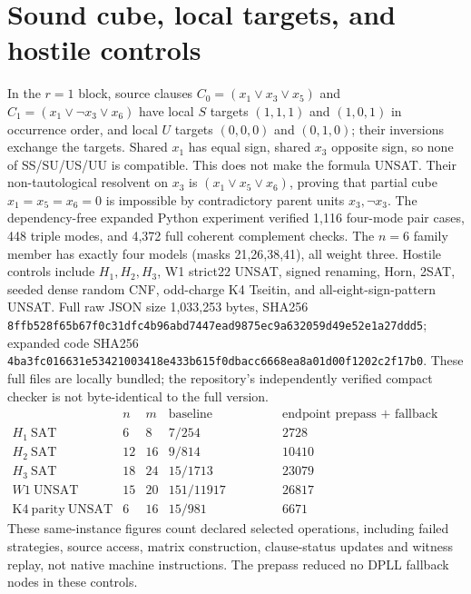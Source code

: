 \documentclass[11pt]{article}
\begin{document}
\section{Sound cube, local targets, and hostile controls}
In the $r=1$ block, source clauses $C_0=(x_1\vee x_3\vee x_5)$ and $C_1=(x_1\vee\neg x_3\vee x_6)$ have local $S$ targets $(1,1,1)$ and $(1,0,1)$ in occurrence order, and local $U$ targets $(0,0,0)$ and $(0,1,0)$; their inversions exchange the targets. Shared $x_1$ has equal sign, shared $x_3$ opposite sign, so none of SS/SU/US/UU is compatible. This does not make the formula UNSAT. Their non-tautological resolvent on $x_3$ is $(x_1\vee x_5\vee x_6)$, proving that partial cube $x_1=x_5=x_6=0$ is impossible by contradictory parent units $x_3,\neg x_3$.
The dependency-free expanded Python experiment verified 1,116 four-mode pair cases, 448 triple modes, and 4,372 full coherent complement checks. The $n=6$ family member has exactly four models (masks 21,26,38,41), all weight three. Hostile controls include $H_1,H_2,H_3$, W1 strict22 UNSAT, signed renaming, Horn, 2SAT, seeded dense random CNF, odd-charge K4 Tseitin, and all-eight-sign-pattern UNSAT. Full raw JSON size 1,033,253 bytes, SHA256 \texttt{8ffb528f65b67f0c31dfc4b96abd7447ead9875ec9a632059d49e52e1a27ddd5}; expanded code SHA256 \texttt{4ba3fc016631e53421003418e433b615f0dbacc6668ea8a01d00f1202c2f17b0}. These full files are locally bundled; the repository's independently verified compact checker is not byte-identical to the full version.
\[
\begin{array}{lrrrr}
 &n&m&\text{baseline nodes/ops}&\text{endpoint prepass + fallback ops}\\
H_1\ \mathrm{SAT}&6&8&7/254&2728\\
H_2\ \mathrm{SAT}&12&16&9/814&10410\\
H_3\ \mathrm{SAT}&18&24&15/1713&23079\\
W1\ \mathrm{UNSAT}&15&20&151/11917&26817\\
\mathrm{K4\ parity\ UNSAT}&6&16&15/981&6671
\end{array}
\]
These same-instance figures count declared selected operations, including failed strategies, source access, matrix construction, clause-status updates and witness replay, not native machine instructions. The prepass reduced no DPLL fallback nodes in these controls.
\end{document}
